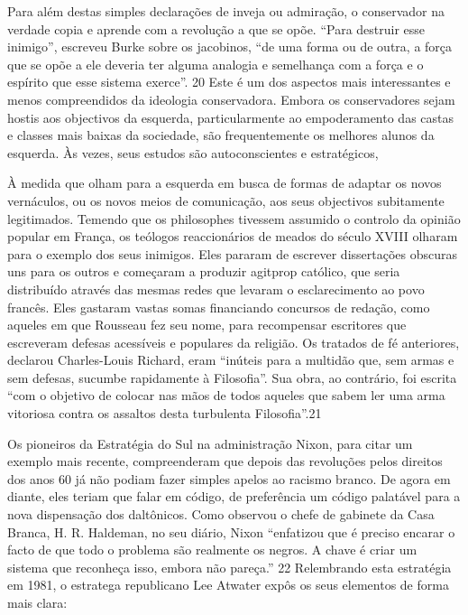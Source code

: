  \par 
Para além destas simples declarações de inveja ou admiração, o conservador na verdade copia e aprende com a revolução a que se opõe. “Para destruir esse inimigo”, escreveu Burke sobre os jacobinos, “de uma forma ou de outra, a força que se opõe a ele deveria ter alguma analogia e semelhança com a força e o espírito que esse sistema exerce”. {\color{blue}20} Este é um dos aspectos mais interessantes e menos compreendidos da ideologia conservadora. Embora os conservadores sejam hostis aos objectivos da esquerda, particularmente ao empoderamento das castas e classes mais baixas da sociedade, são frequentemente os melhores alunos da esquerda. Às vezes, seus estudos são autoconscientes e estratégicos,
 \par 
À medida que olham para a esquerda em busca de formas de adaptar os novos vernáculos, ou os novos meios de comunicação, aos seus objectivos subitamente legitimados. Temendo que os philosophes tivessem assumido o controlo da opinião popular em França, os teólogos reaccionários de meados do século XVIII olharam para o exemplo dos seus inimigos. Eles pararam de escrever dissertações obscuras uns para os outros e começaram a produzir agitprop católico, que seria distribuído através das mesmas redes que levaram o esclarecimento ao povo francês. Eles gastaram vastas somas financiando concursos de redação, como aqueles em que Rousseau fez seu nome, para recompensar escritores que escreveram defesas acessíveis e populares da religião. Os tratados de fé anteriores, declarou Charles-Louis Richard, eram “inúteis para a multidão que, sem armas e sem defesas, sucumbe rapidamente à Filosofia”. Sua obra, ao contrário, foi escrita “com o objetivo de colocar nas mãos de todos aqueles que sabem ler uma arma vitoriosa contra os assaltos desta turbulenta Filosofia”.{\color{blue}21}
 \par 
Os pioneiros da Estratégia do Sul na administração Nixon, para citar um exemplo mais recente, compreenderam que depois das revoluções pelos direitos dos anos {\color{blue}60} já não podiam fazer simples apelos ao racismo branco. De agora em diante, eles teriam que falar em código, de preferência um código palatável para a nova dispensação dos daltônicos. Como observou o chefe de gabinete da Casa Branca, H. R. Haldeman, no seu diário, Nixon “enfatizou que é preciso encarar o facto de que todo o problema são realmente os negros. A chave é criar um sistema que reconheça isso, embora não pareça.” {\color{blue}22} Relembrando esta estratégia em 1981, o estratega republicano Lee Atwater expôs os seus elementos de forma mais clara:
